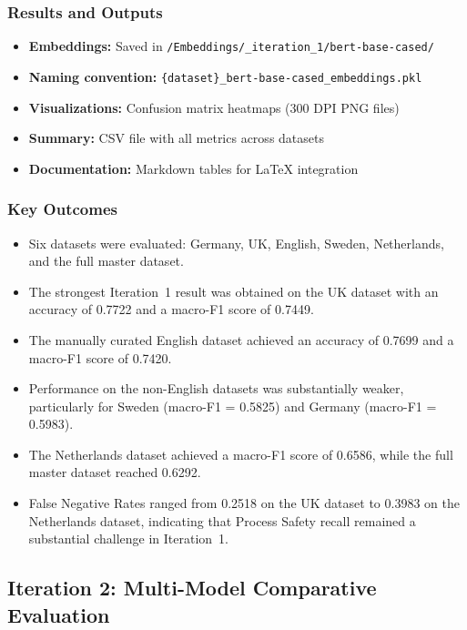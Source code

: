\documentclass[11pt, titlepage, bibliography=totoc]{scrreprt}
\begin{document}
\subsubsection{Results and Outputs}
\begin{itemize}
    \item \textbf{Embeddings:} Saved in \texttt{/Embeddings/\_iteration\_1/bert-base-cased/}
    \item \textbf{Naming convention:} \texttt{\{dataset\}\_bert-base-cased\_embeddings.pkl}
    \item \textbf{Visualizations:} Confusion matrix heatmaps (300 DPI PNG files)
    \item \textbf{Summary:} CSV file with all metrics across datasets
    \item \textbf{Documentation:} Markdown tables for LaTeX integration
\end{itemize}

\subsubsection{Key Outcomes}
\begin{itemize}
    \item Six datasets were evaluated: Germany, UK, English, Sweden, Netherlands, and the full master dataset.
    \item The strongest Iteration~1 result was obtained on the UK dataset with an accuracy of 0.7722 and a macro-F1 score of 0.7449.
    \item The manually curated English dataset achieved an accuracy of 0.7699 and a macro-F1 score of 0.7420.
    \item Performance on the non-English datasets was substantially weaker, particularly for Sweden (macro-F1 = 0.5825) and Germany (macro-F1 = 0.5983).
    \item The Netherlands dataset achieved a macro-F1 score of 0.6586, while the full master dataset reached 0.6292.
    \item False Negative Rates ranged from 0.2518 on the UK dataset to 0.3983 on the Netherlands dataset, indicating that Process Safety recall remained a substantial challenge in Iteration~1.
\end{itemize}

\subsection{Iteration 2: Multi-Model Comparative Evaluation}
\end{document}
